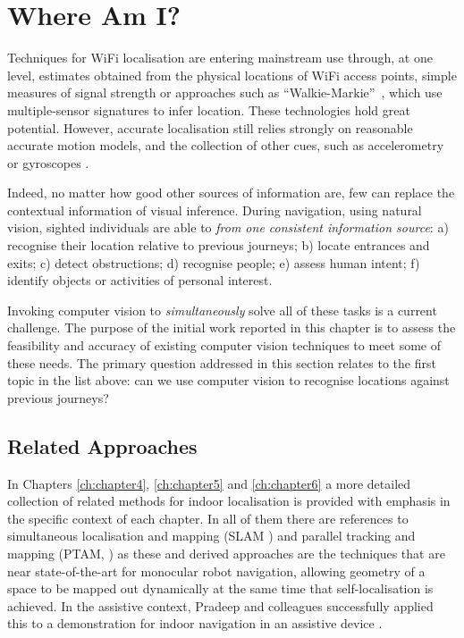 
\section{Where Am I?}

Techniques for WiFi localisation are entering mainstream use through, at one level, estimates obtained from the physical locations of WiFi access points, simple measures of signal strength or approaches such as ``Walkie-Markie''~\cite{Shen}, which use mul\-ti\-ple\--sensor signatures to infer location.  These technologies hold great potential.  However, accurate localisation still relies strongly on reasonable accurate motion models, and the collection of other cues, such as accelerometry or gyroscopes \cite{Wang2012}.  

Indeed, no matter how good other sources of information are, few can replace the contextual information of visual inference.  During navigation, using natural vision, sighted individuals are able to {\em from one consistent information source}: a) recognise their location relative to previous journeys; b) locate entrances and exits; c) detect obstructions; d) recognise people; e) assess human intent;
f) identify objects or activities of personal interest.

Invoking computer vision to \textit{simultaneously} solve all of these tasks is a current challenge.  The purpose of the initial work reported in this chapter is to assess the feasibility and accuracy of existing computer vision techniques to meet some of these needs.  The primary question addressed in this section relates to the first topic in the list above: can we use computer vision to recognise locations against previous journeys?

\subsection{Related Approaches}
 
In Chapters \ref{ch:chapter4}, \ref{ch:chapter5} and \ref{ch:chapter6} a more detailed collection of related methods for indoor localisation is provided with emphasis in the specific context of each chapter. In all of them there are references to simultaneous localisation and mapping (SLAM \cite{Durrant-Whyte2006}) and parallel tracking and mapping (PTAM, \cite{Klein2009}) as these and derived approaches are the techniques that  are near state-of-the-art for monocular robot navigation, allowing geometry of a space to be mapped out dynamically at the same time that self-localisation is achieved.  In the assistive context, Pradeep and colleagues successfully applied this to a demonstration for indoor navigation in an assistive device \cite{Pradeep2010}.

